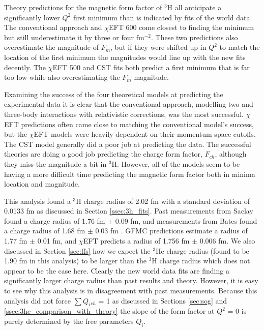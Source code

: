 Theory predictions for the magnetic form factor of $^3$H all anticipate a significantly lower $Q^2$ first minimum than is indicated by fits of the world data. The conventional approach and $\chi$EFT 600 come closest to finding the minimum but still underestimate it by three or four fm$^{-2}$. These two predictions also overestimate the magnitude of $F_m$, but if they were shifted up in $Q^2$ to match the location of the first minimum the magnitudes would line up with the new fits decently. The $\chi$EFT 500 and CST fits both predict a first minimum that is far too low while also overestimating the $F_m$ magnitude. 

Examining the success of the four theoretical models at predicting the experimental data it is clear that the conventional approach, modelling two and three-body interactions with relativistic corrections, was the most successful. $\chi$EFT predictions often came close to matching the conventional model's success, but the $\chi$EFT models were heavily dependent on their momentum space cutoffs. The CST model generally did a poor job at predicting the data. The successful theories are doing a good job predicting the charge form factor, $F_{ch}$, although they miss the magnitude a bit in $^3$H. However, all of the models seem to be having a more difficult time predicting the magnetic form factor both in minima location and magnitude.

This analysis found a $^3$H charge radius of 2.02 fm with a standard deviation of 0.0133 fm as discussed in Section \ref{ssec:3h_fits}. Past measurements from Saclay found a charge radius of 1.76 fm $\pm$ 0.09 fm, and measurements from Bates found a charge radius of 1.68 fm $\pm$ 0.03 fm \cite{3h_proposal}. GFMC predictions estimate a radius of 1.77 fm $\pm$ 0.01 fm, and $\chi$EFT predicts a radius of 1.756 fm $\pm$ 0.006 fm. We also discussed in Section \ref{sec:ffs} how we expect the $^3$He charge radius (found to be 1.90 fm in this analysis) to be larger than the $^3$H charge radius which does not appear to be the case here. Clearly the new world data fits are finding a significantly larger charge radius than past results and theory. However, it is easy to see why this analysis is in disagreement with past measurements. Because this analysis did not force $\sum Q_i{_{ch}}$ = 1 as discussed in Sections \ref{sec:sog} and \ref{ssec:3he_comparison_with_theory} the slope of the form factor at $Q^2$ = 0 is purely determined by the free parameters $Q_i$. 

